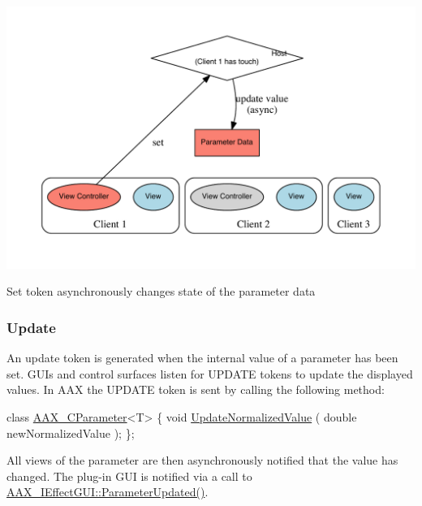 \begin{DoxyImage}
\includegraphics[width=\textwidth,height=\textheight/2,keepaspectratio=true]{dot_aax_parameter_entities_update}
\caption{Set token asynchronously changes state of the parameter data}
\end{DoxyImage}
 \hypertarget{a00352_tokenProtocol_introductionToTokens_update}{}\subsubsection{Update}\label{a00352_tokenProtocol_introductionToTokens_update}
An update token is generated when the internal value of a parameter has been set. G\+U\+Is and control surfaces listen for U\+P\+D\+A\+T\+E tokens to update the displayed values. In A\+A\+X the U\+P\+D\+A\+T\+E token is sent by calling the following method\+:


\begin{DoxyCode}
\textcolor{keyword}{class }\hyperlink{a00033}{AAX\_CParameter}<T>
\{
    \textcolor{keywordtype}{void} \hyperlink{a00033_a8a70b3c8bcff486c18e9a6e5c8ce4dda}{UpdateNormalizedValue} ( \textcolor{keywordtype}{double} newNormalizedValue );
\};
\end{DoxyCode}


All views of the parameter are then asynchronously notified that the value has changed. The plug-\/in G\+U\+I is notified via a call to \hyperlink{a00060_a45b468fef806611581f748af9301ab4d}{A\+A\+X\+\_\+\+I\+Effect\+G\+U\+I\+::\+Parameter\+Updated()}.


